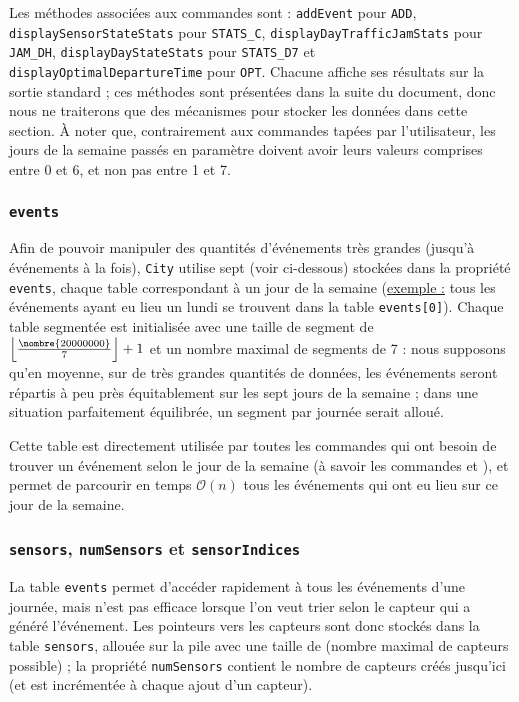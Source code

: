 \documentclass[11pt,a4paper]{article}
\DeclarePairedDelimiter{\floor}{\lfloor}{\rfloor}
\begin{document}
Les méthodes associées aux commandes sont : \texttt{addEvent} pour \texttt{ADD}, \texttt{displaySensorStateStats} pour \texttt{STATS\_C}, \texttt{displayDayTrafficJamStats} pour \texttt{JAM\_DH}, \texttt{displayDayStateStats} pour \texttt{STATS\_D7} et \texttt{displayOptimalDepartureTime} pour \texttt{OPT}. Chacune affiche ses résultats sur la sortie standard ; ces méthodes sont présentées dans la suite du document, donc nous ne traiterons que des mécanismes pour stocker les données dans cette section. À noter que, contrairement aux commandes tapées par l'utilisateur, les jours de la semaine passés en paramètre doivent avoir leurs valeurs comprises entre 0 et 6, et non pas entre 1 et 7.

\subsubsection{\texttt{events}}
Afin de pouvoir manipuler des quantités d'événements très grandes (jusqu'à  événements à la fois), \texttt{City} utilise sept  (voir ci-dessous) stockées dans la propriété \texttt{events}, chaque table correspondant à un jour de la semaine (\underline{exemple :} tous les événements ayant eu lieu un lundi se trouvent dans la table \texttt{events[0]}). Chaque table segmentée est initialisée avec une taille de segment de $ \floor*{\frac{\nombre{20000000}}{7}} + 1 $ et un nombre maximal de segments de 7 : nous supposons qu'en moyenne, sur de très grandes quantités de données, les événements seront répartis à peu près équitablement sur les sept jours de la semaine ; dans une situation parfaitement équilibrée, un segment par journée serait alloué.

Cette table est directement utilisée par toutes les commandes qui ont besoin de trouver un événement selon le jour de la semaine (à savoir les commandes  et ), et permet de parcourir en temps $ \mathcal{O}(n) $ tous les événements qui ont eu lieu sur ce jour de la semaine.

\subsubsection{\texttt{sensors}, \texttt{numSensors} et \texttt{sensorIndices}}

La table \texttt{events} permet d'accéder rapidement à tous les événements d'une journée, mais n'est pas efficace lorsque l'on veut trier selon le capteur qui a généré l'événement. Les pointeurs vers les capteurs sont donc stockés dans la table \texttt{sensors}, allouée sur la pile avec une taille de  (nombre maximal de capteurs possible) ; la propriété \texttt{numSensors} contient le nombre de capteurs créés jusqu'ici (et est incrémentée à chaque ajout d'un capteur).
\end{document}
